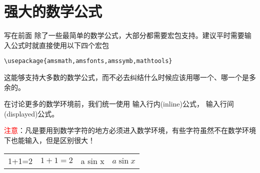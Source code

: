\section{强大的数学公式}
\begin{frame}[fragile]{写在前面}
	除了一些最简单的数学公式，大部分都需要宏包支持。建议平时需要输入公式时就直接使用以下四个宏包
\begin{lstlisting}
\usepackage{amsmath,amsfonts,amssymb,mathtools}
\end{lstlisting}
	这能够支持大多数的数学公式，而不必去纠结什么时候应该用哪一个、哪一个是多余的。

	\vspace{2ex}
	在讨论更多的数学环境前，我们统一使用 \cprotect\fbox{\verb|$|$\dots$\verb|$|} 输入行内(inline)公式，\cprotect\fbox{\verb|\[|$\dots$\verb|\]|} 输入行间(displayed)公式。

	\vspace{2ex}
	\textcolor{red}{注意}：凡是要用到数学字符的地方必须进入数学环境，有些字符虽然不在数学环境下也能输入，但是区别很大！
	\begin{table}
		\begin{tabular}{rlrl}
			\textrm{1+1=2} & $1+1=2$ \quad & \quad \textrm{a sin x} & $a \sin x$
		\end{tabular}
	\end{table}
\end{frame}

